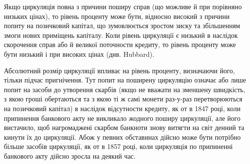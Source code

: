 Якщо циркуляція повна з причини поширу справ (що можливе й при порівняно
низьких цінах), то рівень проценту може бути, відносно високий з причини
попиту на позичковий капітал, що зумовлюється зростом зиску та збільшенням
змоги нових приміщень капіталу. Коли рівень циркуляції є низький в наслідок
скорочення справ або й великої поточности кредиту, то рівень проценту може бути
низький і при високих цінах (див. Hubbard).

Абсолютний розмір циркуляції впливає на рівень проценту, визначаючи
його, тільки підчас пригнічення. Тут попит на поширену циркуляцію означає
або лише попит на засоби до утворення скарбів (якщо не вважати на зменшену
швидкість, з якою гроші обертаються та з якою ті ж самі монети раз-у-раз
перетворюються на позичковий капітал) в наслідок відсутности кредиту, як от
в 1847 році, коли припинення банкового акту не викликало жодного поширу
циркуляції, але його вистачило, щоб нагромаджені скарбом банкноти знову
витягти на світ денний та кинути їх до циркуляції. Абож у певних обставинах
дійсно може бути потрібно більше засобів циркуляції, як от в 1857 році, коли
циркуляція по припиненні банкового акту дійсно зросла на деякий час.
